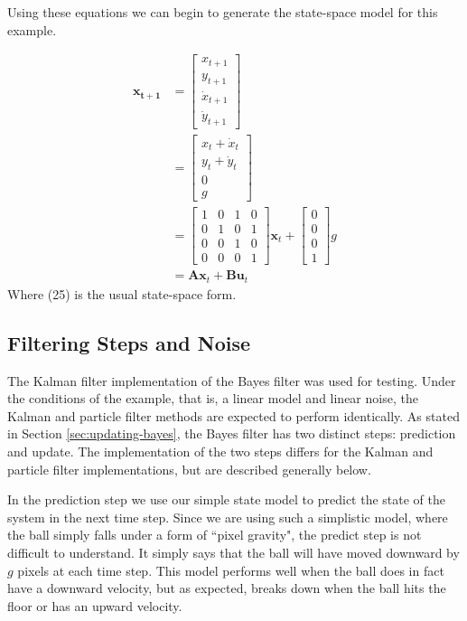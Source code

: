 Using these equations we can begin to generate the state-space model for this
example.

\begin{align}
\mathbf{x_{t+1}} &=
\begin{bmatrix}
x_{t+1} \\ y_{t+1} \\ \dot{x}_{t+1} \\ \dot{y}_{t+1}
\end{bmatrix}
\\
&=
\begin{bmatrix}
x_{t} + \dot{x}_{t} \\ y_{t} + \dot{y}_{t} \\ 0 \\ g
\end{bmatrix}
\\
&=
\begin{bmatrix}
1 & 0 & 1 & 0 \\ 0 & 1 & 0 & 1 \\ 0 & 0 & 1 & 0 \\ 0 & 0 & 0 & 1
\end{bmatrix}
\mathbf{x}_{t} + 
\begin{bmatrix}
0 \\ 0 \\ 0 \\ 1
\end{bmatrix}
g
\\
&=
\mathbf{Ax}_{t} + \mathbf{Bu}_{t}
\end{align}
Where (25) is the usual state-space form.

\subsection{Filtering Steps and Noise}
The Kalman filter implementation of the Bayes filter was used for testing. Under
the conditions of the example, that is, a linear model and linear noise,
the Kalman and particle filter methods are expected to perform identically. As
stated in Section \ref{sec:updating-bayes}, the Bayes filter has two distinct steps:
prediction and update. The implementation of the two steps differs
for the Kalman and particle filter implementations, but are described generally
below.

In the prediction step we use our simple state
model to predict the state of the system in the next time step. Since we are using
such a simplistic model, where the ball simply falls under a form of
``pixel gravity", the predict
step is not difficult to understand. It simply says that the ball will have moved downward by
$g$ pixels at each time step. This model performs well when the ball does in fact
have a downward velocity, but as expected, breaks down when the ball hits the floor
or has an upward velocity.

